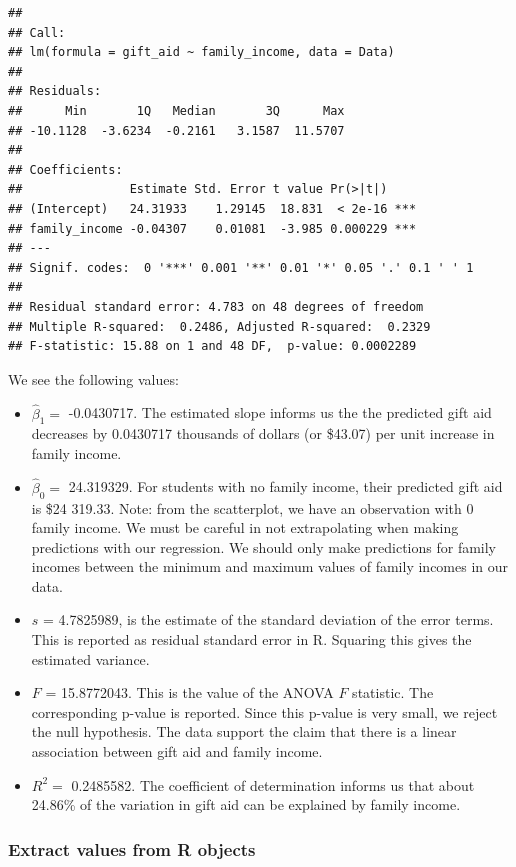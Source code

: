 \documentclass[
]{book}
\providecommand{\tightlist}{%
  \setlength{\itemsep}{0pt}\setlength{\parskip}{0pt}}
\begin{document}
\begin{verbatim}
## 
## Call:
## lm(formula = gift_aid ~ family_income, data = Data)
## 
## Residuals:
##      Min       1Q   Median       3Q      Max 
## -10.1128  -3.6234  -0.2161   3.1587  11.5707 
## 
## Coefficients:
##               Estimate Std. Error t value Pr(>|t|)    
## (Intercept)   24.31933    1.29145  18.831  < 2e-16 ***
## family_income -0.04307    0.01081  -3.985 0.000229 ***
## ---
## Signif. codes:  0 '***' 0.001 '**' 0.01 '*' 0.05 '.' 0.1 ' ' 1
## 
## Residual standard error: 4.783 on 48 degrees of freedom
## Multiple R-squared:  0.2486, Adjusted R-squared:  0.2329 
## F-statistic: 15.88 on 1 and 48 DF,  p-value: 0.0002289
\end{verbatim}

We see the following values:

\begin{itemize}
\tightlist
\item
  \(\hat{\beta}_1 =\) -0.0430717. The estimated slope informs us the the predicted gift aid decreases by 0.0430717 thousands of dollars (or \$43.07) per unit increase in family income.
\item
  \(\hat{\beta}_0 =\) 24.319329. For students with no family income, their predicted gift aid is \$24 319.33. Note: from the scatterplot, we have an observation with 0 family income. We must be careful in not extrapolating when making predictions with our regression. We should only make predictions for family incomes between the minimum and maximum values of family incomes in our data.
\item
  \(s\) = 4.7825989, is the estimate of the standard deviation of the error terms. This is reported as residual standard error in R. Squaring this gives the estimated variance.
\item
  \(F\) = 15.8772043. This is the value of the ANOVA \(F\) statistic. The corresponding p-value is reported. Since this p-value is very small, we reject the null hypothesis. The data support the claim that there is a linear association between gift aid and family income.
\item
  \(R^2 =\) 0.2485582. The coefficient of determination informs us that about 24.86\% of the variation in gift aid can be explained by family income.
\end{itemize}

\hypertarget{extract-values-from-r-objects}{%
\subsubsection*{Extract values from R objects}\label{extract-values-from-r-objects}}
\end{document}
